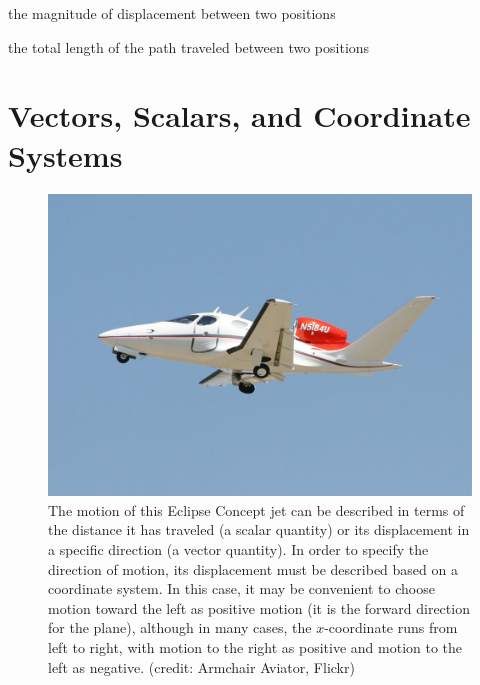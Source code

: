 \documentclass[
]{book}
\providecommand{\tightlist}{%
  \setlength{\itemsep}{0pt}\setlength{\parskip}{0pt}}
\begin{document}
\begin{description}
\tightlist
\item[distance]
the magnitude of displacement between two positions
\end{description}

\begin{description}
\tightlist
\item[distance traveled]
the total length of the path traveled between two positions
\end{description}

\hypertarget{vectors-scalars-and-coordinate-systems}{%
\section{Vectors, Scalars, and Coordinate Systems}\label{vectors-scalars-and-coordinate-systems}}

\begin{figure}
\hypertarget{import-auto-id1778274}{%
\centering
\includegraphics{images/Figure_02_02_00.jpg}
\caption{The motion of this Eclipse Concept jet can be described in terms of
the distance it has traveled (a scalar quantity) or its displacement in
a specific direction (a vector quantity). In order to specify the
direction of motion, its displacement must be described based on a
coordinate system. In this case, it may be convenient to choose motion
toward the left as positive motion (it is the forward direction for the
plane), although in many cases, the \(x{}\)-coordinate runs from left to
right, with motion to the right as positive and motion to the left as
negative. (credit: Armchair Aviator,
Flickr)}\label{import-auto-id1778274}
}
\end{figure}
\end{document}

